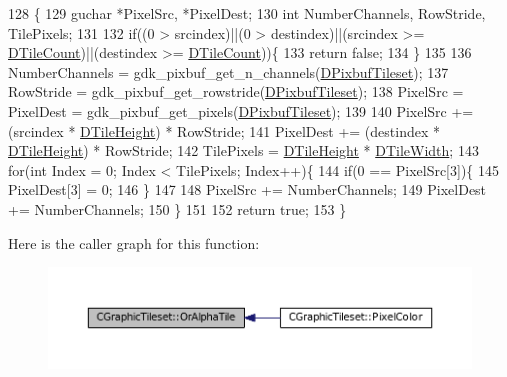 \begin{DoxyCode}
128                                                             \{
129     guchar *PixelSrc, *PixelDest;
130     \textcolor{keywordtype}{int} NumberChannels, RowStride, TilePixels;
131     
132     \textcolor{keywordflow}{if}((0 > srcindex)||(0 > destindex)||(srcindex >= \hyperlink{classCGraphicTileset_a39d942b370e47f441bf97385eb1037c8}{DTileCount})||(destindex >= 
      \hyperlink{classCGraphicTileset_a39d942b370e47f441bf97385eb1037c8}{DTileCount}))\{
133         \textcolor{keywordflow}{return} \textcolor{keyword}{false};
134     \}
135 
136     NumberChannels = gdk\_pixbuf\_get\_n\_channels(\hyperlink{classCGraphicTileset_a5d5adfcdbb347a6df3f57535ca08e3ef}{DPixbufTileset});
137     RowStride = gdk\_pixbuf\_get\_rowstride(\hyperlink{classCGraphicTileset_a5d5adfcdbb347a6df3f57535ca08e3ef}{DPixbufTileset});
138     PixelSrc = PixelDest = gdk\_pixbuf\_get\_pixels(\hyperlink{classCGraphicTileset_a5d5adfcdbb347a6df3f57535ca08e3ef}{DPixbufTileset});
139     
140     PixelSrc += (srcindex * \hyperlink{classCGraphicTileset_af48f32e07d5fe69afd5f764318cc3244}{DTileHeight}) * RowStride;
141     PixelDest += (destindex * \hyperlink{classCGraphicTileset_af48f32e07d5fe69afd5f764318cc3244}{DTileHeight}) * RowStride;
142     TilePixels = \hyperlink{classCGraphicTileset_af48f32e07d5fe69afd5f764318cc3244}{DTileHeight} * \hyperlink{classCGraphicTileset_a2d0c7d19865b81911a3a43d5cae50e00}{DTileWidth};
143     \textcolor{keywordflow}{for}(\textcolor{keywordtype}{int} Index = 0; Index < TilePixels; Index++)\{
144         \textcolor{keywordflow}{if}(0 == PixelSrc[3])\{
145             PixelDest[3] = 0;   
146         \}
147         
148         PixelSrc += NumberChannels;
149         PixelDest += NumberChannels;
150     \}
151     
152     \textcolor{keywordflow}{return} \textcolor{keyword}{true};
153 \}
\end{DoxyCode}
Here is the caller graph for this function\+:\nopagebreak
\begin{figure}[H]
\begin{center}
\leavevmode
\includegraphics[width=350pt]{classCGraphicTileset_ae456fe77a33c9954b6a22133f5843a15_icgraph}
\end{center}
\end{figure}
\hypertarget{classCGraphicTileset_af278c60b01100c430bedfcedd9e9489f}{}\label{classCGraphicTileset_af278c60b01100c430bedfcedd9e9489f} 
